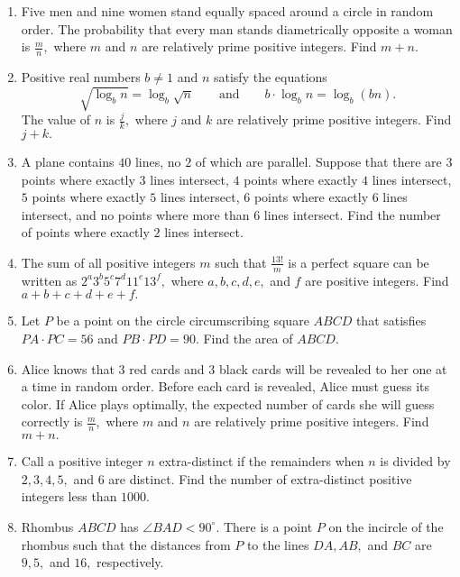 \documentclass{article}
\begin{document}
\begin{enumerate}[label=\arabic*., itemsep=0.5em]
\item Five men and nine women stand equally spaced around a circle in random order. The probability that every man stands diametrically opposite a woman is \(\frac{m}{n},\) where \(m\) and \(n\) are relatively prime positive integers. Find \(m+n.\)\par \vspace{0.5em}\item Positive real numbers \(b \not= 1\) and \(n\) satisfy the equations 
\begin{equation*}
\sqrt{\log_b n} = \log_b \sqrt{n} \qquad \text{and} \qquad b \cdot \log_b n = \log_b (bn).
\end{equation*}
 The value of \(n\) is \(\frac{j}{k},\) where \(j\) and \(k\) are relatively prime positive integers. Find \(j+k.\)\par \vspace{0.5em}\item A plane contains \(40\) lines, no \(2\) of which are parallel. Suppose that there are \(3\) points where exactly \(3\) lines intersect, \(4\) points where exactly \(4\) lines intersect, \(5\) points where exactly \(5\) lines intersect, \(6\) points where exactly \(6\) lines intersect, and no points where more than \(6\) lines intersect. Find the number of points where exactly \(2\) lines intersect.\par \vspace{0.5em}\item The sum of all positive integers \(m\) such that \(\frac{13!}{m}\) is a perfect square can be written as \(2^a3^b5^c7^d11^e13^f,\) where \(a,b,c,d,e,\) and \(f\) are positive integers. Find \(a+b+c+d+e+f.\)\par \vspace{0.5em}\item Let \(P\) be a point on the circle circumscribing square \(ABCD\) that satisfies \(PA \cdot PC = 56\) and \(PB \cdot PD = 90.\) Find the area of \(ABCD.\)\par \vspace{0.5em}\item Alice knows that \(3\) red cards and \(3\) black cards will be revealed to her one at a time in random order. Before each card is revealed, Alice must guess its color. If Alice plays optimally, the expected number of cards she will guess correctly is \(\frac{m}{n},\) where \(m\) and \(n\) are relatively prime positive integers. Find \(m+n.\)\par \vspace{0.5em}\item Call a positive integer \(n\) extra-distinct if the remainders when \(n\) is divided by \(2, 3, 4, 5,\) and \(6\) are distinct. Find the number of extra-distinct positive integers less than \(1000\).\par \vspace{0.5em}\item Rhombus \(ABCD\) has \(\angle BAD < 90^\circ.\) There is a point \(P\) on the incircle of the rhombus such that the distances from \(P\) to the lines \(DA,AB,\) and \(BC\) are \(9,5,\) and \(16,\) respectively. 
\end{enumerate}
\end{document}

